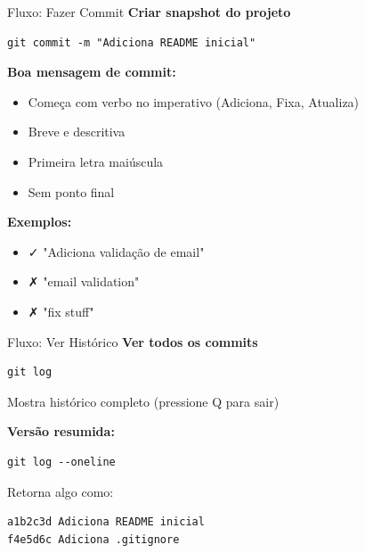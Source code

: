 \documentclass[11pt]{beamer}
\begin{document}
\begin{frame}{Fluxo: Fazer Commit}
\textbf{Criar snapshot do projeto}

\begin{lstlisting}
git commit -m "Adiciona README inicial"
\end{lstlisting}

\vspace{0.5cm}

\textbf{Boa mensagem de commit:}
\begin{itemize}
    \item Começa com verbo no imperativo (Adiciona, Fixa, Atualiza)
    \item Breve e descritiva
    \item Primeira letra maiúscula
    \item Sem ponto final
\end{itemize}

\vspace{0.5cm}

\textbf{Exemplos:}
\begin{itemize}
    \small
    \item ✓ "Adiciona validação de email"
    \item ✗ "email validation"
    \item ✗ "fix stuff"
\end{itemize}
\end{frame}

\begin{frame}{Fluxo: Ver Histórico}
\textbf{Ver todos os commits}

\begin{lstlisting}
git log
\end{lstlisting}

Mostra histórico completo (pressione Q para sair)

\vspace{0.3cm}

\textbf{Versão resumida:}
\begin{lstlisting}
git log --oneline
\end{lstlisting}

\vspace{0.3cm}

Retorna algo como:
\begin{lstlisting}
a1b2c3d Adiciona README inicial
f4e5d6c Adiciona .gitignore
\end{lstlisting}
\end{frame}

\end{document}
